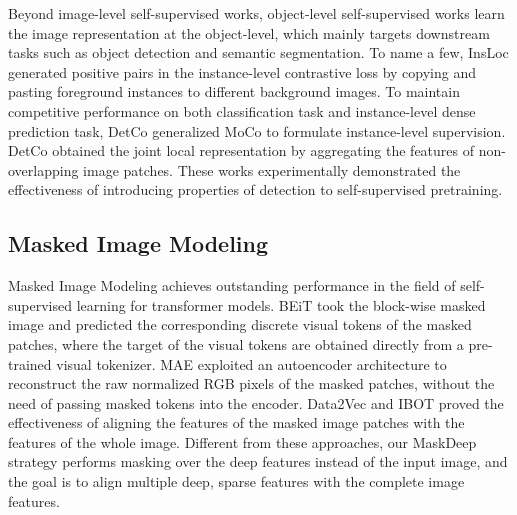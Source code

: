 \documentclass[10pt,twocolumn,letterpaper]{article}
\begin{document}
Beyond image-level self-supervised works, object-level self-supervised works \cite{xie2021detco,wei2021aligning,densecl,insloc} learn the image representation at the object-level, which mainly targets downstream tasks such as object detection and semantic segmentation. To name a few, InsLoc \cite{insloc} generated positive pairs in the instance-level contrastive loss by copying and pasting foreground instances to different background images. To maintain competitive performance on both classification task and instance-level dense prediction task, DetCo \cite{xie2021detco} generalized MoCo \cite{he2020momentum} to formulate instance-level supervision. DetCo obtained the joint local representation by aggregating the features of non-overlapping image patches. These works experimentally demonstrated the effectiveness of introducing properties of detection to self-supervised pretraining. 



\subsection{Masked Image Modeling}
Masked Image Modeling achieves outstanding performance in the field of self-supervised learning for transformer models.
BEiT \cite{bao2021beit} took the block-wise masked image and predicted the corresponding discrete visual tokens of the masked patches, where the target of the visual tokens are obtained directly from a pre-trained visual tokenizer. MAE \cite{he2022masked} exploited an autoencoder architecture to reconstruct the raw normalized RGB pixels of the masked patches, without the need of passing masked tokens into the encoder. Data2Vec \cite{baevski2022data2vec} and IBOT \cite{zhou2021ibot} proved the effectiveness of aligning the features of the masked image patches with the features of the whole image. 
Different from these approaches, our MaskDeep strategy performs masking over the deep features instead of the input image, and the goal is to align multiple deep, sparse features with the complete image features. 
\end{document}
